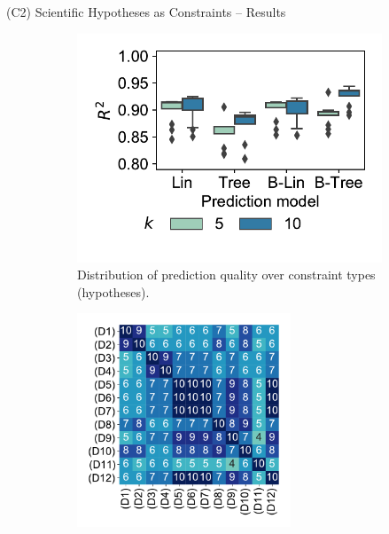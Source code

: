 \documentclass[en, navbarinline, handout]{sdqbeamer}
\begin{document}
\begin{frame}[t]{(C2) Scientific Hypotheses as Constraints -- Results}
	\begin{figure}
		\centering
		\begin{subfigure}{0.48\textwidth}
			\centering
			\includegraphics[width=\textwidth, trim={0 15 0 15}, clip]{plots/ms-prediction-performance-cardinality.pdf}
			\caption*{Distribution of prediction quality over constraint types (hypotheses).}
		\end{subfigure}
		\hfill
		\begin{subfigure}{0.48\textwidth}
			\centering
			\includegraphics[width=0.7\textwidth, trim={0 15 0 15}, clip]{plots/ms-selected-similarity-card10.pdf}

\end{subfigure}
\end{figure}
\end{frame}
\end{document}
